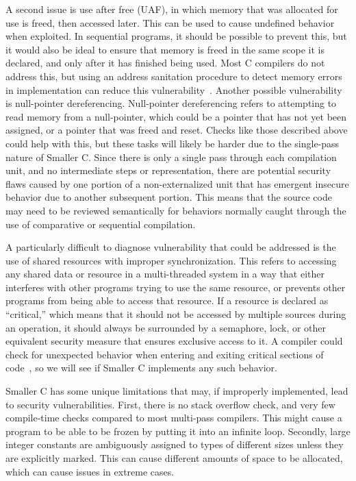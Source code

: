 \documentclass[sigconf, anonymous]{acmart}
\begin{document}
A second issue is use after free (UAF), in which memory that was allocated for use is freed, then accessed later. This can be used to cause undefined behavior when exploited. In sequential programs, it should be possible to prevent this, but it would also be ideal to ensure that memory is freed in the same scope it is declared, and only after it has finished being used. Most C compilers do not address this, but using an address sanitation procedure to detect memory errors in implementation can reduce this vulnerability~\cite{Serebryany:AddressSanitize}. Another possible vulnerability is null-pointer dereferencing. Null-pointer dereferencing refers to attempting to read memory from a null-pointer, which could be a pointer that has not yet been assigned, or a pointer that was freed and reset. Checks like those described above could help with this, but these tasks will likely be harder due to the single-pass nature of Smaller C. Since there is only a single pass through each compilation unit, and no intermediate steps or representation, there are potential security flaws caused by one portion of a non-externalized unit that has emergent insecure behavior due to another subsequent portion. This means that the source code may need to be reviewed semantically for behaviors normally caught through the use of comparative or sequential compilation.



A particularly difficult to diagnose vulnerability that could be addressed is the use of shared resources with improper synchronization. This refers to accessing any shared data or resource in a multi-threaded system in a way that either interferes with other programs trying to use the same resource, or prevents other programs from being able to access that resource. If a resource is declared as “critical,” which means that it should not be accessed by multiple sources during an operation, it should always be surrounded by a semaphore, lock, or other equivalent security measure that ensures exclusive access to it. A compiler could check for unexpected behavior when entering and exiting critical sections of code~\cite{Li:Finding}, so we will see if Smaller C implements any such behavior.

Smaller C has some unique limitations that may, if improperly implemented, lead to security vulnerabilities. First, there is no stack overflow check, and very few compile-time checks compared to most multi-pass compilers. This might cause a program to be able to be frozen by putting it into an infinite loop. Secondly, large integer constants are ambiguously assigned to types of different sizes unless they are explicitly marked. This can cause different amounts of space to be allocated, which can cause issues in extreme cases.
\end{document}
